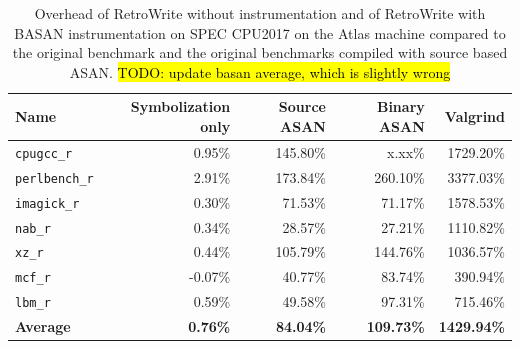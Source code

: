\documentclass[a4paper,11pt,oneside]{report}
\newcommand{\sysname}{RetroWrite\xspace}
\DeclareRobustCommand{\todo}[1]{{\sethlcolor{cyan}\hl{TODO: #1}}}
\begin{document}
\begin{table}
\centering
\begin{tabular}{lrrrr}
\toprule
	\textbf{Name} \hspace{4em} &\textbf{Symbolization only} & \textbf{Source ASAN} & \textbf{Binary ASAN} & \textbf{Valgrind} \\
\toprule

	\texttt{cpugcc\_r   } & 0.95\% &145.80\% & x.xx\% & 1729.20\% \\
	\texttt{perlbench\_r} & 2.91\% &173.84\% &260.10\% &3377.03\% \\
	\texttt{imagick\_r}   & 0.30\% & 71.53\% & 71.17\% &1578.53\% \\
	\texttt{nab\_r      } & 0.34\% & 28.57\% & 27.21\% &1110.82\% \\
	\texttt{xz\_r   }     & 0.44\% &105.79\% &144.76\% &1036.57\% \\
	\texttt{mcf\_r      } &-0.07\% & 40.77\% & 83.74\% & 390.94\% \\
	\texttt{lbm\_r      } & 0.59\% & 49.58\% & 97.31\% & 715.46\% \\
	\midrule
	\textbf{Average} & \textbf{0.76\%} & \textbf{84.04\%} & \textbf{109.73\%} & \textbf{1429.94\%} \\
\bottomrule
\end{tabular}
\caption{Overhead of \sysname without instrumentation and of \sysname with
BASAN instrumentation on SPEC CPU2017 on the Atlas machine compared to the original benchmark
and the original benchmarks compiled with source based ASAN.
\todo{update basan average, which is slightly wrong} } 
\label{labellatabella}
\end{table}
\end{document}
